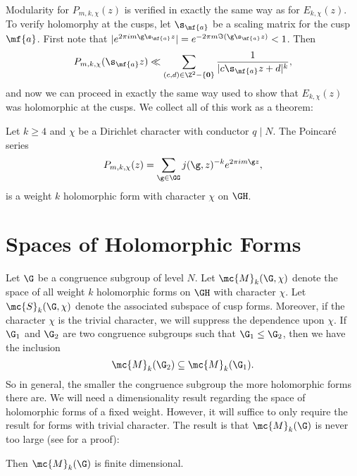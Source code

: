     Modularity for $P_{m,k,\chi}(z)$ is verified in exactly the same way as for $E_{k,\chi}(z)$. To verify holomorphy at the cusps, let $\s_{\mf{a}}$ be a scaling matrix for the cusp $\mf{a}$. First note that $|e^{2\pi im\g\s_{\mf{a}}z}| = e^{-2\pi m\Im(\g\s_{\mf{a}}z)} < 1$. Then
    \[
      P_{m,k,\chi}(\s_{\mf{a}}z) \ll \sum_{(c,d) \in \Z^{2}-\{\mathbf{0}\}}\frac{1}{|c\s_{\mf{a}}z+d|^{k}},
    \]
    and now we can proceed in exactly the same way used to show that $E_{k,\chi}(z)$ was holomorphic at the cusps. We collect all of this work as a theorem:

    \begin{theorem}
      Let $k \ge 4$ and $\chi$ be a Dirichlet character with conductor $q \mid N$. The Poincar\'e series
      \[
        P_{m,k,\chi}(z) = \sum_{\g \in \GG}j(\g,z)^{-k}e^{2\pi im\g z},
      \]
      is a weight $k$ holomorphic form with character $\chi$ on $\GH$.
    \end{theorem}
  \section{Spaces of Holomorphic Forms}
    Let $\G$ be a congruence subgroup of level $N$. Let $\mc{M}_{k}(\G,\chi)$ denote the space of all weight $k$ holomorphic forms on $\GH$ with character $\chi$. Let $\mc{S}_{k}(\G,\chi)$ denote the associated subspace of cusp forms. Moreover, if the character $\chi$ is the trivial character, we will suppress the dependence upon $\chi$. If $\G_{1}$ and $\G_{2}$ are two congruence subgroups such that $\G_{1} \le \G_{2}$, then we have the inclusion
    \[
      \mc{M}_{k}(\G_{2}) \subseteq \mc{M}_{k}(\G_{1}).
    \]
    So in general, the smaller the congruence subgroup the more holomorphic forms there are. We will need a dimensionality result regarding the space of holomorphic forms of a fixed weight. However, it will suffice to only require the result for forms with trivial character. The result is that $\mc{M}_{k}(\G)$ is never too large (see \cite{diamond2005first} for a proof):

    \begin{theorem}\label{thm:modular_forms_space_classification}
      Then $\mc{M}_{k}(\G)$ is finite dimensional.
    \end{theorem}

